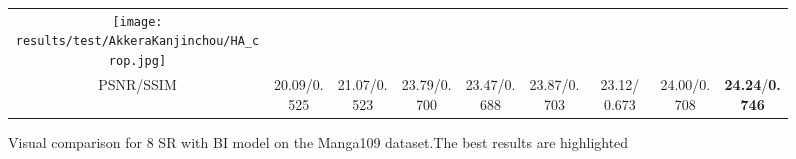\documentclass[runningheads]{llncs}
\begin{document}
\begin{figure}[t]
\begin{center}
\begin{tabular}{@{}ccccccccc@{}}
			\texttt{[image: results/test/AkkeraKanjinchou/HA\_crop.jpg]} \\ 


			PSNR/SSIM & 20.09/0.525 &21.07/0.523 &23.79/0.700 &23.47/0.688 &23.87/0.703 &23.12/ 0.673 &24.00/0.708 &\textbf{24.24}/\textbf{0.746} \\
			
			
		\end{tabular}
	\end{center}


	\caption{Visual comparison for 8 SR with BI model on the Manga109 dataset.The best results are highlighted 
	}

	\label{fig-BD8}
\end{figure}
\end{document}
